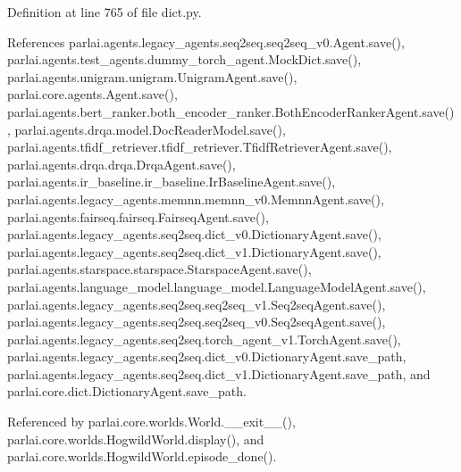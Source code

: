 Definition at line 765 of file dict.\+py.



References parlai.\+agents.\+legacy\+\_\+agents.\+seq2seq.\+seq2seq\+\_\+v0.\+Agent.\+save(), parlai.\+agents.\+test\+\_\+agents.\+dummy\+\_\+torch\+\_\+agent.\+Mock\+Dict.\+save(), parlai.\+agents.\+unigram.\+unigram.\+Unigram\+Agent.\+save(), parlai.\+core.\+agents.\+Agent.\+save(), parlai.\+agents.\+bert\+\_\+ranker.\+both\+\_\+encoder\+\_\+ranker.\+Both\+Encoder\+Ranker\+Agent.\+save(), parlai.\+agents.\+drqa.\+model.\+Doc\+Reader\+Model.\+save(), parlai.\+agents.\+tfidf\+\_\+retriever.\+tfidf\+\_\+retriever.\+Tfidf\+Retriever\+Agent.\+save(), parlai.\+agents.\+drqa.\+drqa.\+Drqa\+Agent.\+save(), parlai.\+agents.\+ir\+\_\+baseline.\+ir\+\_\+baseline.\+Ir\+Baseline\+Agent.\+save(), parlai.\+agents.\+legacy\+\_\+agents.\+memnn.\+memnn\+\_\+v0.\+Memnn\+Agent.\+save(), parlai.\+agents.\+fairseq.\+fairseq.\+Fairseq\+Agent.\+save(), parlai.\+agents.\+legacy\+\_\+agents.\+seq2seq.\+dict\+\_\+v0.\+Dictionary\+Agent.\+save(), parlai.\+agents.\+legacy\+\_\+agents.\+seq2seq.\+dict\+\_\+v1.\+Dictionary\+Agent.\+save(), parlai.\+agents.\+starspace.\+starspace.\+Starspace\+Agent.\+save(), parlai.\+agents.\+language\+\_\+model.\+language\+\_\+model.\+Language\+Model\+Agent.\+save(), parlai.\+agents.\+legacy\+\_\+agents.\+seq2seq.\+seq2seq\+\_\+v1.\+Seq2seq\+Agent.\+save(), parlai.\+agents.\+legacy\+\_\+agents.\+seq2seq.\+seq2seq\+\_\+v0.\+Seq2seq\+Agent.\+save(), parlai.\+agents.\+legacy\+\_\+agents.\+seq2seq.\+torch\+\_\+agent\+\_\+v1.\+Torch\+Agent.\+save(), parlai.\+agents.\+legacy\+\_\+agents.\+seq2seq.\+dict\+\_\+v0.\+Dictionary\+Agent.\+save\+\_\+path, parlai.\+agents.\+legacy\+\_\+agents.\+seq2seq.\+dict\+\_\+v1.\+Dictionary\+Agent.\+save\+\_\+path, and parlai.\+core.\+dict.\+Dictionary\+Agent.\+save\+\_\+path.



Referenced by parlai.\+core.\+worlds.\+World.\+\_\+\+\_\+exit\+\_\+\+\_\+(), parlai.\+core.\+worlds.\+Hogwild\+World.\+display(), and parlai.\+core.\+worlds.\+Hogwild\+World.\+episode\+\_\+done().

